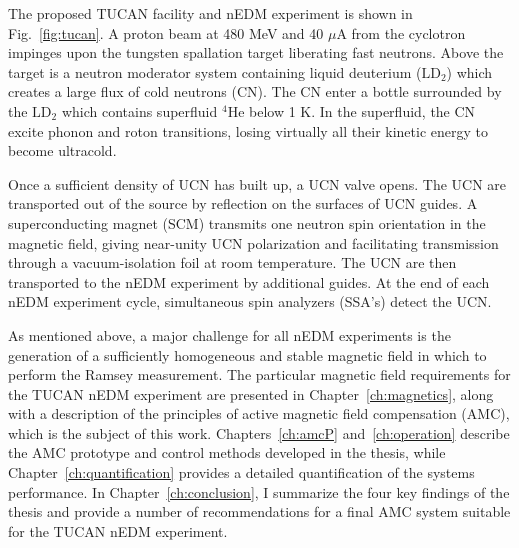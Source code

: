 The proposed TUCAN facility and nEDM experiment is shown in Fig.~\ref{fig:tucan}. A proton beam at 480 MeV and 40 $\mu$A from the cyclotron impinges upon the tungsten spallation target liberating fast neutrons. Above the target is a neutron moderator system containing liquid deuterium ($\mathrm{LD_2}$) which creates a large flux of cold neutrons (CN). The CN enter a bottle surrounded by the $\mathrm{LD_2}$ which contains superfluid $^4\mathrm{He}$ below 1 K. In the superfluid, the CN excite phonon and roton transitions, losing virtually all their kinetic energy to become ultracold. 

Once a sufficient density of UCN has built up, a UCN valve opens. The UCN are transported out of the source by reflection on the surfaces of UCN guides. A superconducting magnet (SCM) transmits one neutron spin orientation in the magnetic field, giving near-unity UCN polarization and facilitating transmission through a vacuum-isolation foil at room temperature. The UCN are then transported to the nEDM experiment by additional guides. At the end of each nEDM experiment cycle, simultaneous spin analyzers (SSA's) detect the UCN.


As mentioned above, a major challenge for all nEDM experiments is the generation of a sufficiently homogeneous and stable magnetic field in which to perform the Ramsey measurement. The particular magnetic field requirements for  the TUCAN nEDM experiment are presented in Chapter~\ref{ch:magnetics}, along with a description of the principles of active magnetic field compensation (AMC), which is the subject of this work. Chapters~\ref{ch:amcP} and~\ref{ch:operation} describe the AMC prototype and control methods developed in the thesis, while Chapter~\ref{ch:quantification} provides a detailed quantification of the systems performance. In Chapter~\ref{ch:conclusion}, I summarize the four key findings of the thesis and provide a number of recommendations for a final AMC system suitable for the TUCAN nEDM experiment.








